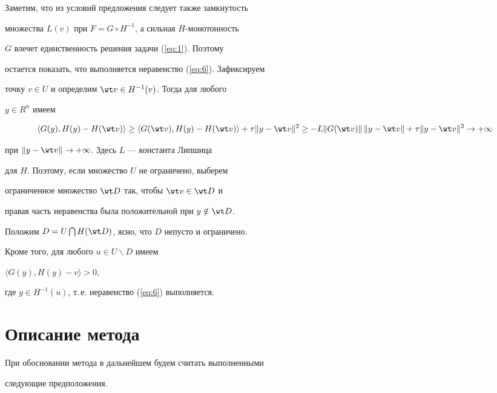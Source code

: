 \begin{pf}


Заметим, что из условий предложения следует также замкнутость 


множества $L(v)$ при $F=G \circ H^{-1}$, а сильная $H$-монотонность 


$G$ влечет единственность решения задачи (\ref{eq:1}). Поэтому 


остается показать, что выполняется неравенство (\ref{eq:6}). Зафиксируем 


точку $v \in U$ и определим $\wt v \in H^{-1}(v)$. Тогда для любого 


$y \in R^{n}$ имеем


$$


\langle G(y), H(y) - H(\wt v) \rangle 


\geq \langle G(\wt v), H(y) - H(\wt v) \rangle+\tau \| y - \wt v \|^{2} 


\geq - L \| G(\wt v) \|\, \| y - \wt v \|+


\tau \| y - \wt v \|^{2} \rightarrow+\infty 


$$


при $\| y - \wt v \| \rightarrow+\infty$. Здесь $L$ --- константа Липшица 


для $H$. Поэтому, если множество $U$ не ограничено, выберем 


ограниченное множество $\wt D$ так, чтобы $\wt v \in \wt D$ и 


правая часть неравенства была положительной при $y \notin \wt D$. 


Положим $D=U \bigcap H(\wt D)$, ясно, что $D$ непусто и ограничено. 


Кроме того, для любого $u \in U \backslash D$ имеем


$\langle G(y), H(y) - v \rangle > 0$,


где $y \in H^{-1}(u)$, т.\,е. неравенство (\ref{eq:6}) выполняется.


\end{pf}





\section{Описание метода}





При обосновании метода в дальнейшем будем считать выполненными 


следующие предположения.


